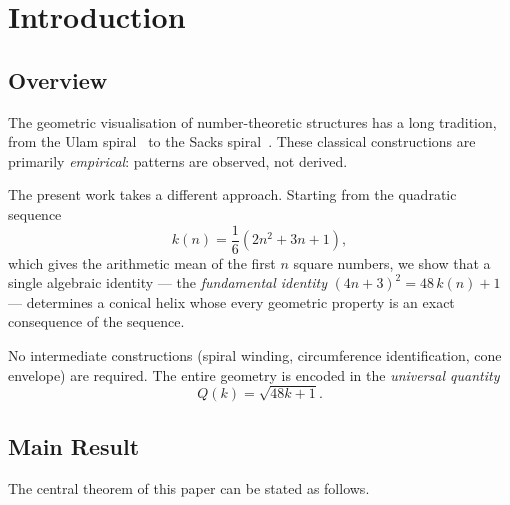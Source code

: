 \section{Introduction}\label{sec:introduction}

\subsection{Overview}

The geometric visualisation of number-theoretic structures has a long
tradition, from the Ulam spiral~\cite{Stein1964} to the Sacks
spiral~\cite{Sacks2003}. These classical constructions are primarily
\emph{empirical}: patterns are observed, not derived.

The present work takes a different approach. Starting from the quadratic
sequence
\begin{equation}\label{eq:k-def}
  k(n) = \frac{1}{6}(2n^2 + 3n + 1),
\end{equation}
which gives the arithmetic mean of the first $n$ square numbers, we show
that a single algebraic identity --- the \emph{fundamental identity}
$(4n+3)^2 = 48\,k(n)+1$ --- determines a conical helix whose every
geometric property is an exact consequence of the sequence.

No intermediate constructions (spiral winding, circumference identification,
cone envelope) are required. The entire geometry is encoded in the
\emph{universal quantity}
\begin{equation}\label{eq:Q-intro}
  Q(k) = \sqrt{48k+1}.
\end{equation}

\subsection{Main Result}

The central theorem of this paper can be stated as follows.

